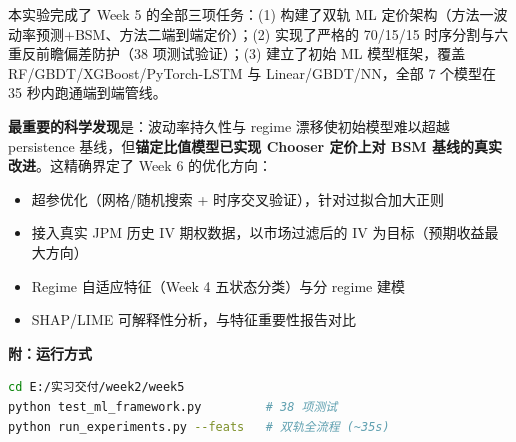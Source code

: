 \documentclass[a4paper,11pt]{article}
\begin{document}
本实验完成了 Week 5 的全部三项任务：(1) 构建了双轨 ML 定价架构（方法一波动率预测+BSM、方法二端到端定价）；(2) 实现了严格的 70/15/15 时序分割与六重反前瞻偏差防护（38 项测试验证）；(3) 建立了初始 ML 模型框架，覆盖 RF/GBDT/XGBoost/PyTorch-LSTM 与 Linear/GBDT/NN，全部 7 个模型在 35 秒内跑通端到端管线。

\textbf{最重要的科学发现}是：波动率持久性与 regime 漂移使初始模型难以超越 persistence 基线，但\textbf{锚定比值模型已实现 Chooser 定价上对 BSM 基线的真实改进}。这精确界定了 Week 6 的优化方向：

\begin{itemize}
    \item 超参优化（网格/随机搜索 + 时序交叉验证），针对过拟合加大正则
    \item 接入真实 JPM 历史 IV 期权数据，以市场过滤后的 IV 为目标（预期收益最大方向）
    \item Regime 自适应特征（Week 4 五状态分类）与分 regime 建模
    \item SHAP/LIME 可解释性分析，与特征重要性报告对比
\end{itemize}

\vspace{0.5cm}
\noindent\textbf{附：运行方式}
\begin{lstlisting}[language=bash,caption={复现命令},label={lst:run}]
cd E:/实习交付/week2/week5
python test_ml_framework.py         # 38 项测试
python run_experiments.py --feats   # 双轨全流程 (~35s)
\end{lstlisting}
\end{document}
